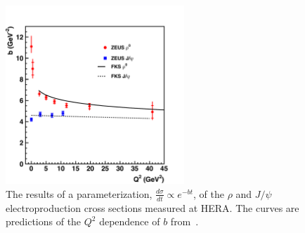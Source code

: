 \begin{figure}[!h]
    \centering
    \includegraphics[width=0.6\textwidth]{chap2/hera.pdf}
    \caption{The results of a parameterization,
             $\frac{d\sigma}{dt}\propto e^{-bt}$, of the $\rho$ and $J/\psi$
             electroproduction cross sections measured at HERA.
             The curves are predictions of the $Q^2$ dependence of $b$
             from~\cite{Frankfurt_1998}.
            }
    \label{fig:hera}
\end{figure}


